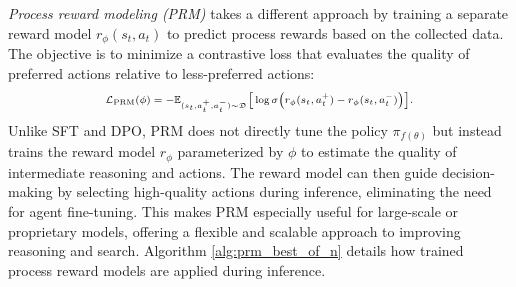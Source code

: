 \textit{Process reward modeling (PRM)} takes a different approach by training a separate reward model \(r_\phi(s_t, a_t)\) to predict process rewards based on the collected data. The objective is to minimize a contrastive loss that evaluates the quality of preferred actions relative to less-preferred actions:
\begin{equation}\scriptsize
\begin{aligned}
\mathcal{L}_{\text{PRM}}(\phi) = - \mathbb{E}_{(s_t, a_t^+, a_t^-) \sim \mathfrak{D}} \Big[  \log \sigma \big( r_\phi(s_t, a_t^+) - r_\phi(s_t, a_t^-) \big) \Big].
\end{aligned}
\end{equation}
Unlike SFT and DPO, PRM does not directly tune the policy \(\pi_{f(\theta)}\) but instead trains the reward model \(r_\phi\) parameterized by \(\phi\) to estimate the quality of intermediate reasoning and actions. The reward model can then guide decision-making by selecting high-quality actions during inference, eliminating the need for agent fine-tuning. This makes PRM especially useful for large-scale or proprietary models, offering a flexible and scalable approach to improving reasoning and search.
Algorithm \ref{alg:prm_best_of_n} details how trained process reward models are applied during inference.


